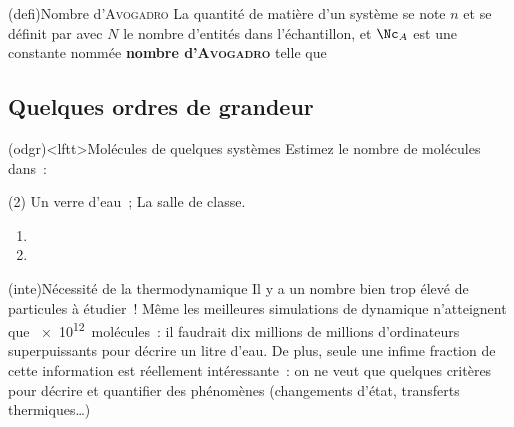 \documentclass[../../main/main.tex]{subfiles}
\begin{document}
\begin{tcb}[sidebyside](defi){Nombre d'\textsc{Avogadro}}
	La quantité de matière d'un système se note $n$ et se définit par
	\psw{
		\[
			\boxed{n = \frac{N}{\Nc_A}}
			\quad \text{en \textbf{moles}, \si{mol}}
		\]
	}%
	\tcblower
	avec $N$ le nombre d'entités dans l'échantillon, et $\Nc_A$ est une
	constante nommée \textbf{nombre d'\textsc{Avogadro}} telle que
	\psw{
		\[
			\Nc_A = \SI{6.02214076e23}{mol^{-1}}
		\]
	}%
\end{tcb}

\subsection{Quelques ordres de grandeur}
\begin{tcb}(odgr)<lftt>{Molécules de quelques systèmes}
	Estimez le nombre de molécules dans~:
	\begin{tasks}[label=\arabic*)](2)
		\task Un verre d'eau~;
		\task La salle de classe.
	\end{tasks}
	\tcblower
	\begin{enumerate}
		\item {}%
		\item {}%
	\end{enumerate}
\end{tcb}

\begin{tcb}(inte){Nécessité de la thermodynamique}
	Il y a un nombre bien trop élevé de particules à étudier~! Même les meilleures
	simulations de dynamique n'atteignent que \SI{e12}{molécules}~: il faudrait
	dix millions de millions d'ordinateurs superpuissants pour décrire un litre
	d'eau.
	\smallbreak
	De plus, seule une infime fraction de cette information est réellement
	intéressante~: on ne veut que quelques critères pour décrire et quantifier des
	phénomènes (changements d'état, transferts thermiques…)
\end{tcb}
\end{document}
